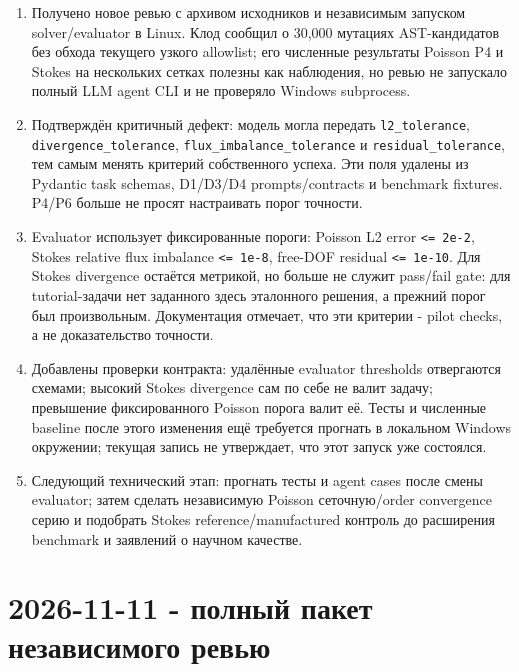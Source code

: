 \documentclass[11pt,a4paper]{article}
\begin{document}
\begin{enumerate}
    \item Получено новое ревью с архивом исходников и независимым запуском solver/evaluator в Linux. Клод сообщил о 30,000 мутациях AST-кандидатов без обхода текущего узкого allowlist; его численные результаты Poisson P4 и Stokes на нескольких сетках полезны как наблюдения, но ревью не запускало полный LLM agent CLI и не проверяло Windows subprocess.
    \item Подтверждён критичный дефект: модель могла передать \texttt{l2\_tolerance}, \texttt{divergence\_tolerance}, \texttt{flux\_imbalance\_tolerance} и \texttt{residual\_tolerance}, тем самым менять критерий собственного успеха. Эти поля удалены из Pydantic task schemas, D1/D3/D4 prompts/contracts и benchmark fixtures. P4/P6 больше не просят настраивать порог точности.
    \item Evaluator использует фиксированные пороги: Poisson L2 error \texttt{<= 2e-2}, Stokes relative flux imbalance \texttt{<= 1e-8}, free-DOF residual \texttt{<= 1e-10}. Для Stokes divergence остаётся метрикой, но больше не служит pass/fail gate: для tutorial-задачи нет заданного здесь эталонного решения, а прежний порог был произвольным. Документация отмечает, что эти критерии - pilot checks, а не доказательство точности.
    \item Добавлены проверки контракта: удалённые evaluator thresholds отвергаются схемами; высокий Stokes divergence сам по себе не валит задачу; превышение фиксированного Poisson порога валит её. Тесты и численные baseline после этого изменения ещё требуется прогнать в локальном Windows окружении; текущая запись не утверждает, что этот запуск уже состоялся.
    \item Следующий технический этап: прогнать тесты и agent cases после смены evaluator; затем сделать независимую Poisson сеточную/order convergence серию и подобрать Stokes reference/manufactured контроль до расширения benchmark и заявлений о научном качестве.
\end{enumerate}

\section{2026-11-11 - полный пакет независимого ревью}
\end{document}
